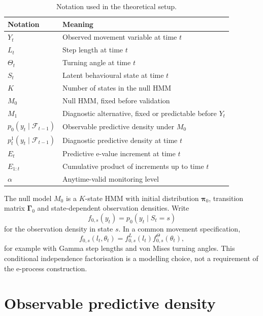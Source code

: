 \documentclass[11pt]{article}
\begin{document}
\begin{table}[h]
\centering
\begin{tabular}{ll}
\toprule
Notation & Meaning \\
\midrule
$Y_t$ & Observed movement variable at time $t$ \\
$L_t$ & Step length at time $t$ \\
$\Theta_t$ & Turning angle at time $t$ \\
$S_t$ & Latent behavioural state at time $t$ \\
$K$ & Number of states in the null HMM \\
$M_0$ & Null HMM, fixed before validation \\
$M_1$ & Diagnostic alternative, fixed or predictable before $Y_t$ \\
$p_0(y_t \mid \mathcal F_{t-1})$ & Observable predictive density under $M_0$ \\
$p_t^1(y_t \mid \mathcal F_{t-1})$ & Diagnostic predictive density at time $t$ \\
$E_t$ & Predictive e-value increment at time $t$ \\
$E_{1:t}$ & Cumulative product of increments up to time $t$ \\
$\alpha$ & Anytime-valid monitoring level \\
\bottomrule
\end{tabular}
\caption{Notation used in the theoretical setup.}
\label{tab:notation}
\end{table}

The null model $M_0$ is a $K$-state HMM with initial distribution $\boldsymbol\pi_0$, transition matrix $\boldsymbol\Gamma_0$ and state-dependent observation densities. Write
\begin{equation}
f_{0,s}(y_t) = p_0(y_t \mid S_t=s)
\end{equation}
for the observation density in state $s$. In a common movement specification,
\begin{equation}
f_{0,s}(l_t,\theta_t) = f_{0,s}^L(l_t) f_{0,s}^{\Theta}(\theta_t),
\end{equation}
for example with Gamma step lengths and von Mises turning angles. This conditional independence factorisation is a modelling choice, not a requirement of the e-process construction.

\section{Observable predictive density}
\end{document}
